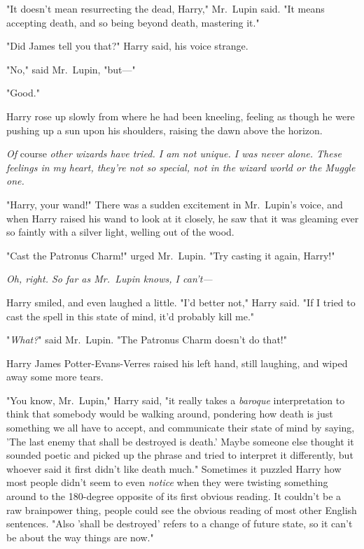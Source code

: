 "It doesn't mean resurrecting the dead, Harry," Mr.~Lupin said. "It means 
accepting death, and so being beyond death, mastering it."

"Did James tell you that?" Harry said, his voice strange.

"No," said Mr.~Lupin, "but---"

"Good."

Harry rose up slowly from where he had been kneeling, feeling as though he were 
pushing up a sun upon his shoulders, raising the dawn above the horizon.

\emph{Of} course\emph{ other wizards have tried. I am not unique. I was never 
alone. These feelings in my heart, they're not so special, not in the wizard 
world or the Muggle one.}

"Harry, your wand!" There was a sudden excitement in Mr.~Lupin's voice, and 
when Harry raised his wand to look at it closely, he saw that it was gleaming 
ever so faintly with a silver light, welling out of the wood.

"Cast the Patronus Charm!" urged Mr.~Lupin. "Try casting it again, Harry!"

\emph{Oh, right. So far as Mr.~Lupin knows, I can't---}

Harry smiled, and even laughed a little. "I'd better not," Harry said. "If I 
tried to cast the spell in this state of mind, it'd probably kill me."

"\emph{What?}" said Mr.~Lupin. "The Patronus Charm doesn't do that!"

Harry James Potter-Evans-Verres raised his left hand, still laughing, and wiped 
away some more tears.

"You know, Mr.~Lupin," Harry said, "it really takes a \emph{baroque} 
interpretation to think that somebody would be walking around, pondering how 
death is just something we all have to accept, and communicate their state of 
mind by saying, 'The last enemy that shall be destroyed is death.' Maybe 
someone else thought it sounded poetic and picked up the phrase and tried to 
interpret it differently, but whoever said it first didn't like death much." 
Sometimes it puzzled Harry how most people didn't seem to even \emph{notice} 
when they were twisting something around to the 180-degree opposite of its 
first obvious reading. It couldn't be a raw brainpower thing, people could see 
the obvious reading of most other English sentences. "Also 'shall be destroyed' 
refers to a change of future state, so it can't be about the way things are 
now."

